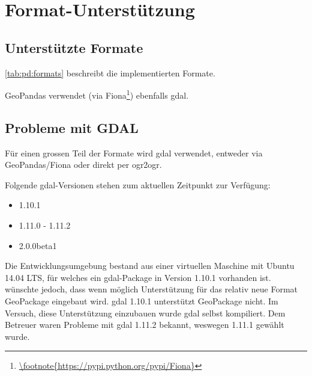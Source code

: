 \section{Format-Unterstützung}
\subsection{Unterstützte Formate}
\cref{tab:pd:formats} beschreibt die implementierten Formate.


GeoPandas verwendet (via Fiona\footnote{\url{\footnote{https://pypi.python.org/pypi/Fiona}}}) ebenfalls \gls{gdal}.

\subsection{Probleme mit GDAL}\label{sec:pd:format-gdal-problems}
Für einen grossen Teil der Formate wird \gls{gdal} verwendet, entweder via GeoPandas/Fiona oder direkt per ogr2ogr. 

Folgende \gls{gdal}-Versionen stehen zum aktuellen Zeitpunkt zur Verfügung:
\begin{itemize}
\item 1.10.1
\item 1.11.0 - 1.11.2
\item 2.0.0beta1
\end{itemize}

Die Entwicklungsumgebung bestand aus einer virtuellen Maschine mit Ubuntu 14.04 LTS, für welches ein \gls{gdal}-Package in Version 1.10.1 vorhanden ist. \proff wünschte jedoch, dass wenn möglich Unterstützung für das relativ neue Format GeoPackage eingebaut wird. \gls{gdal} 1.10.1 unterstützt GeoPackage nicht. Im Versuch, diese Unterstützung einzubauen wurde \gls{gdal} selbst kompiliert. Dem Betreuer waren Probleme mit \gls{gdal} 1.11.2 bekannt, weswegen 1.11.1 gewählt wurde.

